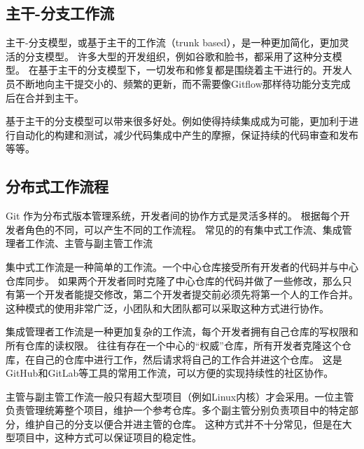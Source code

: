 \documentclass[../main.tex]{subfiles}
\begin{document}
\subsection{主干-分支工作流}

主干-分支模型，或基于主干的工作流（trunk based），是一种更加简化，更加灵活的分支模型。
许多大型的开发组织，例如谷歌和脸书，都采用了这种分支模型。\cite{trunkbased}
在基于主干的分支模型下，一切发布和修复都是围绕着主干进行的。开发人员不断地向主干提交小的、频繁的更新，而不需要像Gitflow那样待功能分支完成后在合并到主干。

基于主干的分支模型可以带来很多好处。例如使得持续集成成为可能，更加利于进行自动化的构建和测试，减少代码集成中产生的摩擦，保证持续的代码审查和发布等等。
\subsection{分布式工作流程}

Git 作为分布式版本管理系统，开发者间的协作方式是灵活多样的。
根据每个开发者角色的不同，可以产生不同的工作流程。
常见的的有集中式工作流、集成管理者工作流、主管与副主管工作流

集中式工作流是一种简单的工作流。一个中心仓库接受所有开发者的代码并与中心仓库同步。
如果两个开发者同时克隆了中心仓库的代码并做了一些修改，那么只有第一个开发者能提交修改，第二个开发者提交前必须先将第一个人的工作合并。
这种模式的使用非常广泛，小团队和大团队都可以采取这种方式进行协作。

集成管理者工作流是一种更加复杂的工作流，每个开发者拥有自己仓库的写权限和所有仓库的读权限。
往往有存在一个中心的“权威”仓库，所有开发者克隆这个仓库，在自己的仓库中进行工作，然后请求将自己的工作合并进这个仓库。
这是GitHub和GitLab等工具的常用工作流，可以方便的实现持续性的社区协作。

主管与副主管工作流一般只有超大型项目（例如Linux内核）才会采用。一位主管负责管理统筹整个项目，维护一个参考仓库。多个副主管分别负责项目中的特定部分，维护自己的分支以便合并进主管的仓库。
这种方式并不十分常见，但是在大型项目中，这种方式可以保证项目的稳定性。
\end{document}

